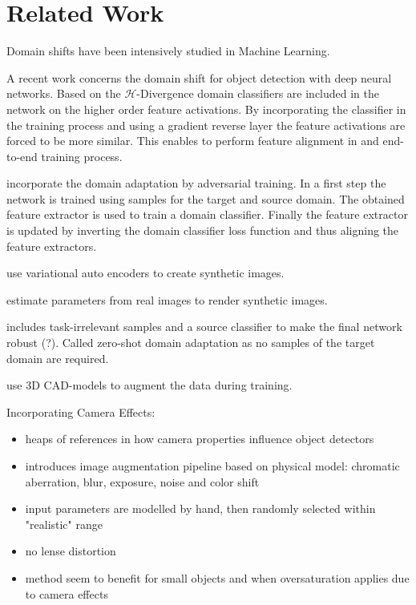 \section{Related Work}
\label{sec:training:related}

Domain shifts have been intensively studied in Machine Learning. 

A recent work \cite{Chen2018c} concerns the domain shift for object detection with deep neural networks. Based on the $\mathcal{H}$-Divergence \cite{Ben-David2010} domain classifiers are included in the network on the higher order feature activations. By incorporating the classifier in the training process and using a gradient reverse layer  the feature activations are forced to be more similar. This enables to perform feature alignment in and end-to-end training process.

\cite{Xu2017} incorporate the domain adaptation by adversarial training. In a first step the network is trained using samples for the target and source domain. The obtained feature extractor is used to train a domain classifier. Finally the feature extractor is updated by inverting the domain classifier loss function and thus aligning the feature extractors.

\cite{Inoue} use variational auto encoders to create synthetic images.

\cite{Rozantsev} estimate parameters from real images to render synthetic images.

\cite{Peng2017} includes task-irrelevant samples and a source classifier to make the final network robust (?). Called zero-shot domain adaptation as no samples of the target domain are required.

\cite{Liu2018a}

\cite{Peng} use 3D CAD-models to augment the data during training.

Incorporating Camera Effects:
\cite{Carlson2018}
\begin{itemize}
	\item heaps of references in how camera properties influence object detectors
	\item introduces image augmentation pipeline based on physical model: chromatic aberration, blur, exposure, noise and color shift
	\item input parameters are modelled by hand, then randomly selected within "realistic" range
	\item no lense distortion
	\item method seem to benefit for small objects and when oversaturation applies due to camera effects
\end{itemize}


